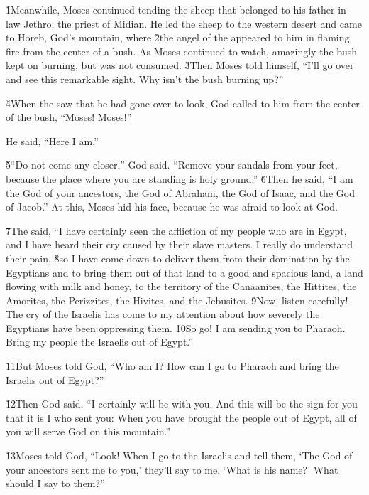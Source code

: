 \v{1}Meanwhile, Moses continued tending the sheep that belonged to his father-in-law Jethro, the priest of Midian. He led the sheep to the western desert and came to Horeb, God's mountain, where \v{2}the angel of the  appeared to him in flaming fire from the center of a bush. As Moses continued to watch, amazingly the bush kept on burning, but was not consumed. \v{3}Then Moses told himself, ``I'll go over and see this remarkable sight. Why isn't the bush burning up?''

\v{4}When the  saw that he had gone over to look, God called to him from the center of the bush, ``Moses! Moses!''

He said, ``Here I am.''

\v{5}``Do not come any closer,'' God said. ``Remove your sandals from your feet, because the place where you are standing is holy ground.'' \v{6}Then he said, ``I am the God of your ancestors, the God of Abraham, the God of Isaac, and the God of Jacob.'' At this, Moses hid his face, because he was afraid to look at God.

\v{7}The  said, ``I have certainly seen the affliction of my people who are in Egypt, and I have heard their cry caused by their slave masters. I really do understand their pain, \v{8}so I have come down to deliver them from their domination by the Egyptians and to bring them out of that land to a good and spacious land, a land flowing with milk and honey, to the territory of the Canaanites, the Hittites, the Amorites, the Perizzites, the Hivites, and the Jebusites. \v{9}Now, listen carefully! The cry of the Israelis has come to my attention about how severely the Egyptians have been oppressing them. \v{10}So go! I am sending you to Pharaoh. Bring my people the Israelis out of Egypt.''

\v{11}But Moses told God, ``Who am I? How can I go to Pharaoh and bring the Israelis out of Egypt?''

\v{12}Then God said, ``I certainly will be with you. And this will be the sign for you that it is I who sent you: When you have brought the people out of Egypt, all of you will serve God on this mountain.''

\v{13}Moses told God, ``Look! When I go to the Israelis and tell them, `The God of your ancestors sent me to you,' they'll say to me, `What is his name?' What should I say to them?''

